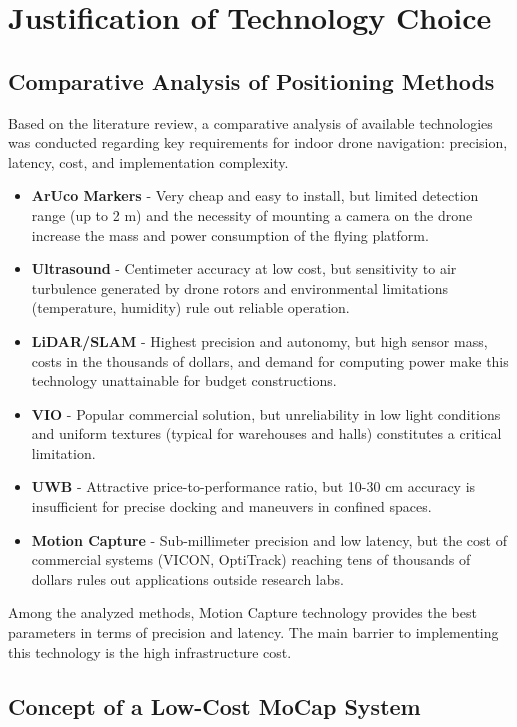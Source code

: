 \documentclass{EE-dyplom}
\begin{document}
\section{Justification of Technology Choice}

\subsection{Comparative Analysis of Positioning Methods}

Based on the literature review, a comparative analysis of available technologies was conducted regarding key requirements for indoor drone navigation: precision, latency, cost, and implementation complexity.

\begin{itemize}
    \item \textbf{ArUco Markers} - Very cheap and easy to install, but limited detection range (up to 2 m) and the necessity of mounting a camera on the drone increase the mass and power consumption of the flying platform.
    \item \textbf{Ultrasound} - Centimeter accuracy at low cost, but sensitivity to air turbulence generated by drone rotors and environmental limitations (temperature, humidity) rule out reliable operation.
    \item \textbf{LiDAR/SLAM} - Highest precision and autonomy, but high sensor mass, costs in the thousands of dollars, and demand for computing power make this technology unattainable for budget constructions.
    \item \textbf{VIO} - Popular commercial solution, but unreliability in low light conditions and uniform textures (typical for warehouses and halls) constitutes a critical limitation.
    \item \textbf{UWB} - Attractive price-to-performance ratio, but 10-30 cm accuracy is insufficient for precise docking and maneuvers in confined spaces.
    \item \textbf{Motion Capture} - Sub-millimeter precision and low latency, but the cost of commercial systems (VICON, OptiTrack) reaching tens of thousands of dollars rules out applications outside research labs.
\end{itemize}

Among the analyzed methods, Motion Capture technology provides the best parameters in terms of precision and latency. The main barrier to implementing this technology is the high infrastructure cost.

\subsection{Concept of a Low-Cost MoCap System}
\end{document}
